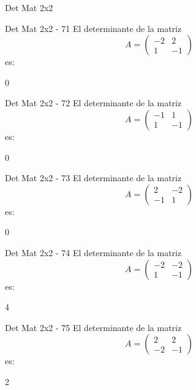 \documentclass[a4,11pt]{aleph-notas}
\begin{document}
\begin{quiz}{Det Mat 2x2}
\begin{numerical}[tolerance=0]%
    {Det Mat 2x2 - 71}
    El determinante de la matriz
    \[
        A = \begin{pmatrix} -2 & 2 \\ 1 & -1 \end{pmatrix}
    \]
    es:
    \item[] 0
\end{numerical}

\begin{numerical}[tolerance=0]%
    {Det Mat 2x2 - 72}
    El determinante de la matriz
    \[
        A = \begin{pmatrix} -1 & 1 \\ 1 & -1 \end{pmatrix}
    \]
    es:
    \item[] 0
\end{numerical}

\begin{numerical}[tolerance=0]%
    {Det Mat 2x2 - 73}
    El determinante de la matriz
    \[
        A = \begin{pmatrix} 2 & -2 \\ -1 & 1 \end{pmatrix}
    \]
    es:
    \item[] 0
\end{numerical}

\begin{numerical}[tolerance=0]%
    {Det Mat 2x2 - 74}
    El determinante de la matriz
    \[
        A = \begin{pmatrix} -2 & -2 \\ 1 & -1 \end{pmatrix}
    \]
    es:
    \item[] 4
\end{numerical}

\begin{numerical}[tolerance=0]%
    {Det Mat 2x2 - 75}
    El determinante de la matriz
    \[
        A = \begin{pmatrix} 2 & 2 \\ -2 & -1 \end{pmatrix}
    \]
    es:
    \item[] 2
\end{numerical}


\end{quiz}
\end{document}
